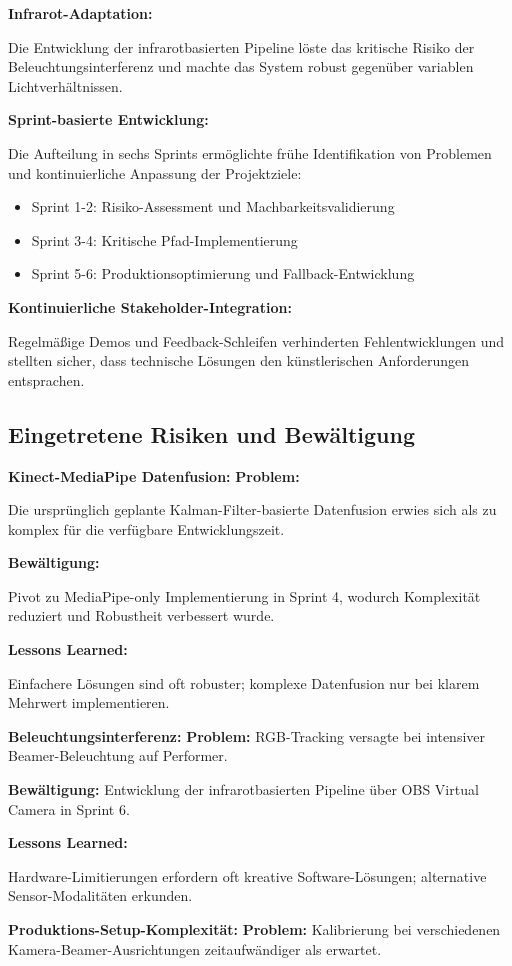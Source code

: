 \textbf{Infrarot-Adaptation:}
\raggedright Die Entwicklung der infrarotbasierten Pipeline löste das kritische Risiko der Beleuchtungsinterferenz und machte das System robust gegenüber variablen Lichtverhältnissen.

\textbf{Sprint-basierte Entwicklung:}
\raggedright Die Aufteilung in sechs Sprints ermöglichte frühe Identifikation von Problemen und kontinuierliche Anpassung der Projektziele:

\begin{itemize}
    \item Sprint 1-2: Risiko-Assessment und Machbarkeitsvalidierung
    \item Sprint 3-4: Kritische Pfad-Implementierung
    \item Sprint 5-6: Produktionsoptimierung und Fallback-Entwicklung
\end{itemize}

\textbf{Kontinuierliche Stakeholder-Integration:}
\raggedright Regelmäßige Demos und Feedback-Schleifen verhinderten Fehlentwicklungen und stellten sicher, dass technische Lösungen den künstlerischen Anforderungen entsprachen.

\subsection{Eingetretene Risiken und Bewältigung}

\textbf{Kinect-MediaPipe Datenfusion:}
\textbf{Problem:} \raggedright Die ursprünglich geplante Kalman-Filter-basierte Datenfusion erwies sich als zu komplex für die verfügbare Entwicklungszeit.

\textbf{Bewältigung:} \raggedright Pivot zu MediaPipe-only Implementierung in Sprint 4, wodurch Komplexität reduziert und Robustheit verbessert wurde.

\textbf{Lessons Learned:} \raggedright Einfachere Lösungen sind oft robuster; komplexe Datenfusion nur bei klarem Mehrwert implementieren.

\textbf{Beleuchtungsinterferenz:}
\textbf{Problem:} RGB-Tracking versagte bei intensiver Beamer-Beleuchtung auf Performer.

\textbf{Bewältigung:} Entwicklung der infrarotbasierten Pipeline über OBS Virtual Camera in Sprint 6.

\textbf{Lessons Learned:} \raggedright Hardware-Limitierungen erfordern oft kreative Software-Lösungen; alternative Sensor-Modalitäten erkunden.

\textbf{Produktions-Setup-Komplexität:}
\textbf{Problem:} Kalibrierung bei verschiedenen Kamera-Beamer-Ausrichtungen zeitaufwändiger als erwartet.

